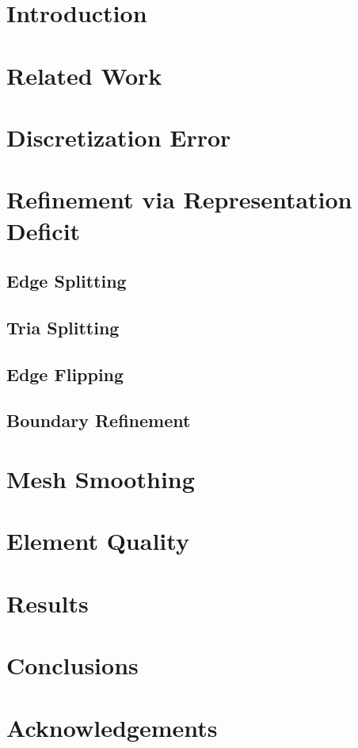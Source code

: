\documentclass[11pt]{article}
\begin{document}
\section{Introduction}


\section{Related Work}

\section{Discretization Error}


\section{Refinement via Representation Deficit}


\subsection{Edge Splitting}


\subsection{Tria Splitting}


\subsection{Edge Flipping}


\subsection{Boundary Refinement}


\section{Mesh Smoothing}


\section{Element Quality}
\section{Results}
\section{Conclusions}
\section{Acknowledgements}
\end{document}
